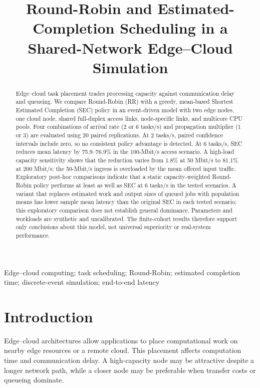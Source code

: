 \documentclass[conference]{IEEEtran}
\title{Round-Robin and Estimated-Completion Scheduling in a Shared-Network Edge--Cloud Simulation}
\author{\IEEEauthorblockN{Anonymous Authors}}
\begin{document}
\maketitle

\begin{abstract}
Edge--cloud task placement trades processing capacity against communication delay and queueing. We compare Round-Robin (RR) with a greedy, mean-based Shortest Estimated Completion (SEC) policy in an event-driven model with two edge nodes, one cloud node, shared full-duplex access links, node-specific links, and multicore CPU pools. Four combinations of arrival rate (2 or 6 tasks/s) and propagation multiplier (1 or 3) are evaluated using 20 paired replications. At 2 tasks/s, paired confidence intervals include zero, so no consistent policy advantage is detected. At 6 tasks/s, SEC reduces mean latency by 75.9--76.9\% in the 100-Mbit/s access scenario. A high-load capacity sensitivity shows that the reduction varies from 1.8\% at 50 Mbit/s to 81.1\% at 200 Mbit/s; the 50-Mbit/s ingress is overloaded by the mean offered input traffic. Exploratory post-hoc comparisons indicate that a static capacity-weighted Round-Robin policy performs at least as well as SEC at 6 tasks/s in the tested scenarios. A variant that replaces estimated work and output sizes of queued jobs with population means has lower sample mean latency than the original SEC in each tested scenario; this exploratory comparison does not establish general dominance. Parameters and workloads are synthetic and uncalibrated. The finite-cohort results therefore support only conclusions about this model, not universal superiority or real-system performance.
\end{abstract}

\begin{IEEEkeywords}
Edge--cloud computing; task scheduling; Round-Robin; estimated completion time; discrete-event simulation; end-to-end latency
\end{IEEEkeywords}

\section{Introduction}
Edge--cloud architectures allow applications to place computational work on nearby edge resources or a remote cloud. This placement affects computation time and communication delay. A high-capacity node may be attractive despite a longer network path, while a closer node may be preferable when transfer costs or queueing dominate.
\end{document}

